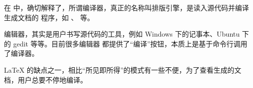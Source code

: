 %
%
%
%
%


在  中，确切解释了，所谓编译器，真正的名称叫排版引擎，是读入源代码并编译生成文档的
程序，如 \pdfTeX{}、\XeTeX{} 等。

编辑器，其实是用户书写源代码的工具，例如 Windows 下的记事本、Ubuntu 下的 gedit 等等。目前很多编辑器
都提供了“编译”按钮，本质上是基于命令行调用了编译器。


\LaTeX{} 的缺点之一，相比“所见即所得”的模式有一些不便，为了查看生成的文档，用户总要不停地编译。  

